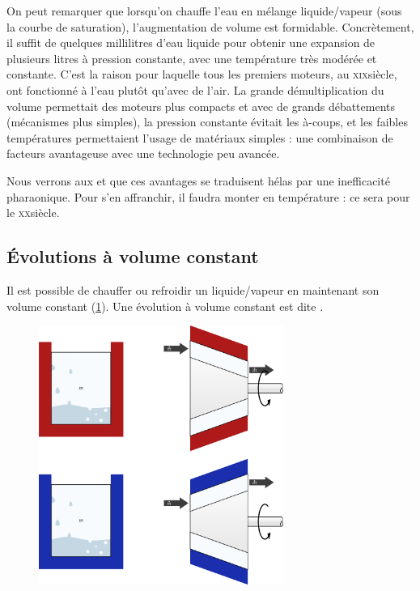 		On peut remarquer que lorsqu’on chauffe l’eau en mélange liquide/vapeur (sous la courbe de saturation), l’augmentation de volume est formidable. Concrètement, il suffit de quelques millilitres d’eau liquide pour obtenir une expansion de plusieurs litres à pression constante, avec une température très modérée et constante. C’est la raison pour laquelle tous les premiers moteurs, au \textsc{xix}\ieme siècle, ont fonctionné à l’eau plutôt qu’avec de l’air. La grande démultiplication du volume permettait des moteurs plus compacts et avec de grands débattements (mécanismes plus simples), la pression constante évitait les à-coups, et les faibles températures permettaient l’usage de matériaux simples : une combinaison de facteurs avantageuse avec une technologie peu avancée.
		
		Nous verrons aux \courssept et \coursneuf que ces avantages se traduisent hélas par une inefficacité 
pharaonique. Pour s’en affranchir, il faudra monter en température : ce sera pour le \textsc{xx}\ieme siècle.


	\subsection{Évolutions à volume constant}
	\label{ch_lv_isochores}

		Il est possible de chauffer ou refroidir un liquide/vapeur en maintenant son volume constant (\cref{fig_lv_isochore}). Une évolution à volume constant est dite . 

		\begin{figure}
			\begin{center}
				\includegraphics[width=8cm]{images/lv_isochore.png}
			\end{center}
			\label{fig_lv_isochore}
		\end{figure}
		
